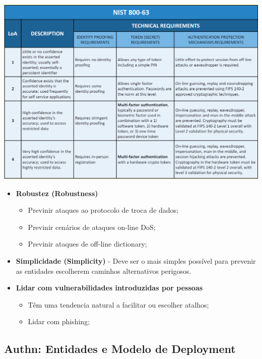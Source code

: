 \documentclass{article}
\begin{document}
\pagebreak

\begin{center}
  \includegraphics[scale=0.5]{19}
\end{center}

\begin{itemize}
  \item \textbf{Robustez (Robustness)}
  \begin{itemize}
    \item Previnir ataques ao protocolo de troca de dados;
    \item Previnir cenários de ataques on-line DoS;
    \item Previnir ataques de off-line dictionary;
  \end{itemize}

  \item \textbf{Simplicidade (Simplicity)} - Deve ser o mais simples
  possível para prevenir as entidades escolherem caminhos alternativos perigosos.

  \item \textbf{Lidar com vulnerabilidades introduzidas por pessoas}
  \begin{itemize}
    \item Têm uma tendencia natural a facilitar ou escolher atalhos;
    \item Lidar com phishing;
  \end{itemize}
\end{itemize}

\subsection{Authn: Entidades e Modelo de Deployment}
\end{document}
